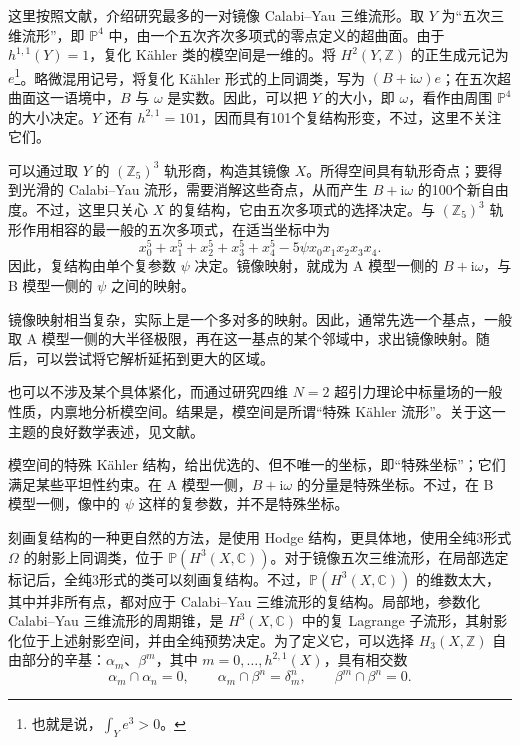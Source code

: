 这里按照文献，介绍研究最多的一对镜像 Calabi--Yau 三维流形。取 $Y$ 为“五次三维流形”，即 $\mathbb{P}^4$ 中，由一个五次齐次多项式的零点定义的超曲面。由于 $h^{1,1}(Y)=1$，复化 K\"ahler 类的模空间是一维的。将 $H^2(Y,\mathbb{Z})$ 的正生成元记为 $e$\footnote{也就是说，$\int_Ye^3>0$。}。略微混用记号，将复化 K\"ahler 形式的上同调类，写为 $(B+\mathrm{i}\omega)e$；在五次超曲面这一语境中，$B$ 与 $\omega$ 是实数。因此，可以把 $Y$ 的大小，即 $\omega$，看作由周围 $\mathbb{P}^4$ 的大小决定。$Y$ 还有 $h^{2,1}=101$，因而具有101个复结构形变，不过，这里不关注它们。

可以通过取 $Y$ 的 $(\mathbb{Z}_5)^3$ 轨形商，构造其镜像 $X$。所得空间具有轨形奇点；要得到光滑的 Calabi--Yau 流形，需要消解这些奇点，从而产生 $B+\mathrm{i}\omega$ 的100个新自由度。不过，这里只关心 $X$ 的复结构，它由五次多项式的选择决定。与 $(\mathbb{Z}_5)^3$ 轨形作用相容的最一般的五次多项式，在适当坐标中为
\begin{equation}\label{eq:3.130}
x_0^5+x_1^5+x_2^5+x_3^5+x_4^5
-5\psi x_0x_1x_2x_3x_4.
\end{equation}
因此，复结构由单个复参数 $\psi$ 决定。镜像映射，就成为 A 模型一侧的 $B+\mathrm{i}\omega$，与 B 模型一侧的 $\psi$ 之间的映射。

镜像映射相当复杂，实际上是一个多对多的映射。因此，通常先选一个基点，一般取 A 模型一侧的大半径极限，再在这一基点的某个邻域中，求出镜像映射。随后，可以尝试将它解析延拓到更大的区域。

也可以不涉及某个具体紧化，而通过研究四维 $N=2$ 超引力理论中标量场的一般性质，内禀地分析模空间。结果是，模空间是所谓“特殊 K\"ahler 流形”。关于这一主题的良好数学表述，见文献。

模空间的特殊 K\"ahler 结构，给出优选的、但不唯一的坐标，即“特殊坐标”；它们满足某些平坦性约束。在 A 模型一侧，$B+\mathrm{i}\omega$ 的分量是特殊坐标。不过，在 B 模型一侧，像中的 $\psi$ 这样的复参数，并不是特殊坐标。

刻画复结构的一种更自然的方法，是使用 Hodge 结构，更具体地，使用全纯3形式 $\Omega$ 的射影上同调类，位于 $\mathbb{P}(H^3(X,\mathbb{C}))$。对于镜像五次三维流形，在局部选定标记后，全纯3形式的类可以刻画复结构。不过，$\mathbb{P}(H^3(X,\mathbb{C}))$ 的维数太大，其中并非所有点，都对应于 Calabi--Yau 三维流形的复结构。局部地，参数化 Calabi--Yau 三维流形的周期锥，是 $H^3(X,\mathbb{C})$ 中的复 Lagrange 子流形，其射影化位于上述射影空间，并由全纯预势决定。为了定义它，可以选择 $H_3(X,\mathbb{Z})$ 自由部分的辛基：$\alpha_m$、$\beta^m$，其中 $m=0,\ldots,h^{2,1}(X)$，具有相交数
\begin{equation}\label{eq:3.131}
\alpha_m\cap\alpha_n=0,\qquad
\alpha_m\cap\beta^n=\delta_m^n,\qquad
\beta^m\cap\beta^n=0.
\end{equation}

